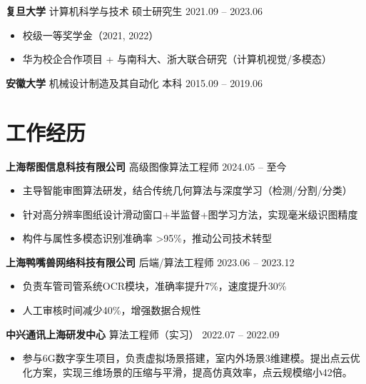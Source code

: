\documentclass[a4paper,10pt]{article}
\begin{document}
\textbf{复旦大学} \quad 计算机科学与技术 \quad 硕士研究生 \hfill 2021.09 -- 2023.06
\begin{itemize}[leftmargin=*,topsep=4pt,itemsep=-2pt]
    \item 校级一等奖学金（2021, 2022）
    \item 华为校企合作项目 + 与南科大、浙大联合研究（计算机视觉/多模态）
\end{itemize}

\textbf{安徽大学} \quad 机械设计制造及其自动化 \quad 本科 \hfill 2015.09 -- 2019.06

\section*{工作经历}
\vspace{0.5em} %

\textbf{上海帮图信息科技有限公司} \quad 高级图像算法工程师 \hfill 2024.05 -- 至今
\begin{itemize}[leftmargin=*]
    \item 主导智能审图算法研发，结合传统几何算法与深度学习（检测/分割/分类）
    \item 针对高分辨率图纸设计滑动窗口+半监督+图学习方法，实现毫米级识图精度
    \item 构件与属性多模态识别准确率 >95\%，推动公司技术转型
\end{itemize}
\vspace{0.5em} %
\textbf{上海鸭嘴兽网络科技有限公司} \quad 后端/算法工程师 \hfill 2023.06 -- 2023.12
\begin{itemize}[leftmargin=*]
    \item 负责车管司管系统OCR模块，准确率提升7\%，速度提升30\%
    \item 人工审核时间减少40\%，增强数据合规性
\end{itemize}

\vspace{0.5em} %

\textbf{中兴通讯上海研发中心} \quad 算法工程师（实习） \hfill 2022.07 -- 2022.09
\begin{itemize}[leftmargin=*,topsep=0pt]
    \item 参与6G数字孪生项目，负责虚拟场景搭建，室内外场景3维建模。提出点云优化方案，实现三维场景的压缩与平滑，提高仿真效率，点云规模缩小42倍。
\end{itemize}


\end{document}

